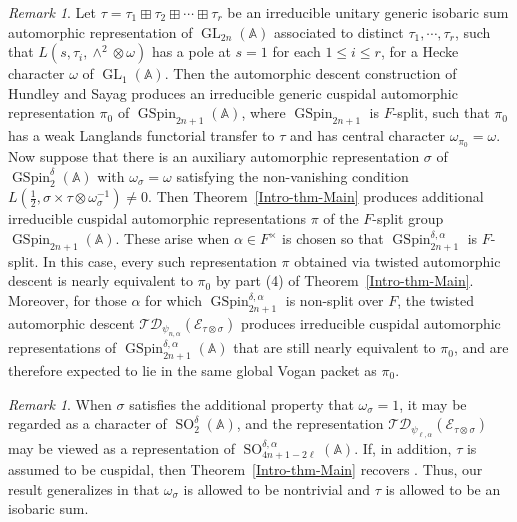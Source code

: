 \documentclass[12pt]{amsart}
\newcommand{\A}{\mathbb{A}}
\newcommand{\TD}{\mathcal{TD}}
\newcommand{\CE}{{\mathcal{E}}}
\theoremstyle{remark}
\newtheorem{remark}[theorem]{Remark}%
\DeclareMathOperator{\GL}{GL}
\DeclareMathOperator{\SO}{SO}
\DeclareMathOperator{\GSpin}{GSpin}
\begin{document}
\begin{remark}
Let $\tau=\tau_1\boxplus \tau_2\boxplus \cdots \boxplus \tau_r$ be an irreducible unitary generic isobaric sum automorphic representation of $\GL_{2n}(\A)$ associated to distinct $\tau_1, \cdots, \tau_r$, such that $L(s, \tau_i, \wedge^2\otimes\omega)$ has a pole at $s=1$ for each $1\le i\le r$, for a Hecke character $\omega$ of $\GL_1(\A)$. Then the automorphic descent construction of Hundley and Sayag \cite{HundleySayag2016} produces an irreducible generic cuspidal automorphic representation $\pi_0$ of $\GSpin_{2n+1}(\A)$, where $\GSpin_{2n+1}$ is $F$-split, such that $\pi_0$ has a weak Langlands functorial transfer to $\tau$ and has central character $\omega_{\pi_0}=\omega$. 
Now suppose that there is an auxiliary automorphic representation $\sigma$ of $\GSpin_2^{\delta}(\A)$ with $\omega_{\sigma}=\omega$ satisfying the non-vanishing condition $L(\frac{1}{2},\sigma\times\tau\otimes \omega_{\sigma}^{-1})\not=0$. Then Theorem~\ref{Intro-thm-Main} produces additional irreducible cuspidal automorphic representations $\pi$ of the $F$-split group $\GSpin_{2n+1}(\A)$. These arise when $\alpha\in F^\times$ is chosen so that $\GSpin_{2n+1}^{\delta,\alpha}$ is $F$-split. In this case, every such representation $\pi$ obtained via twisted automorphic descent is nearly equivalent to $\pi_0$ by part (4) of Theorem~\ref{Intro-thm-Main}. Moreover, for those $\alpha$ for which $\GSpin_{2n+1}^{\delta,\alpha}$ is non-split over $F$, the twisted automorphic descent $\TD_{\psi_{n,\alpha}}(\CE_{\tau\otimes\sigma})$  produces irreducible cuspidal automorphic representations of $\GSpin_{2n+1}^{\delta,\alpha}(\A)$ that are still nearly equivalent to $\pi_0$, and are therefore expected to lie in the same global Vogan packet as $\pi_0$.
\end{remark}


\begin{remark}
When $\sigma$ satisfies the additional property that $\omega_\sigma=1$, it may be regarded as a character of $\SO_2^{\delta}(\A)$, and the representation $\TD_{\psi_{\ell,\alpha}}(\CE_{\tau\otimes\sigma})$ may be viewed as a representation of $\SO^{\delta,\alpha}_{4n+1-2\ell}(\A)$. If, in addition, $\tau$ is assumed to be cuspidal, then Theorem~\ref{Intro-thm-Main} recovers \cite[Theorem 1.2]{JiangLiuXuZhang2016}. Thus, our result generalizes \cite[Theorem 1.2]{JiangLiuXuZhang2016} in that $\omega_{\sigma}$ is allowed to be nontrivial and $\tau$ is allowed to be an isobaric sum. 
\end{remark}
\end{document}
